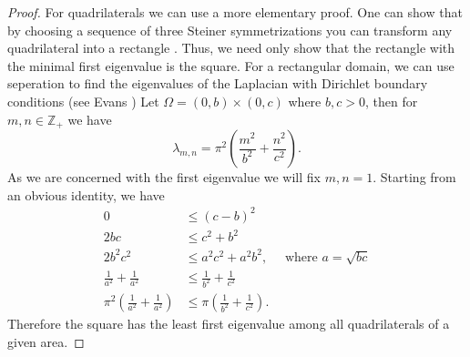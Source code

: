 \begin{proof}
  For quadrilaterals we can use a more elementary proof.
  One can show that by choosing a sequence of three Steiner symmetrizations you can transform any quadrilateral into a rectangle \cite{henrot}.
  Thus, we need only show that the rectangle with the minimal first eigenvalue is the square.
  For a rectangular domain, we can use seperation to find the eigenvalues of the Laplacian with Dirichlet boundary conditions (see Evans \cite{evans})
  Let $\Omega = \left( 0, b \right) \times \left( 0,c \right)$ where $b,c > 0$, then for $m,n\in \mathbb{Z}_{+}$ we have
  \[
  \lambda_{m,n} = \pi^{2}\left( \frac{m^{2}}{b^{2}} + \frac{n^{2}}{c^{2}} \right)
  .\] 
  As we are concerned with the first eigenvalue we will fix $m,n = 1$.
  Starting from an obvious identity, we have
  \begin{align*}
    0 &\leq \left( c - b \right)^{2} \\
    2bc &\leq c^{2} + b^{2} \\
    2b^{2}c^{2} &\leq a^{2}c^{2} + a^{2}b^{2}, \quad \text{ where } a = \sqrt{bc} \\
    \frac{1}{a^{2}} + \frac{1}{a^{2}} &\leq \frac{1}{b^{2} } + \frac{1}{c^{2}} \\
    \pi^{2}\left( \frac{1}{a^{2}} + \frac{1}{a^{2}} \right) &\leq \pi \left( \frac{1}{b^{2} } + \frac{1}{c^{2}} \right)
  .\end{align*}
  Therefore the square has the least first eigenvalue among all quadrilaterals of a given area.
\end{proof}

